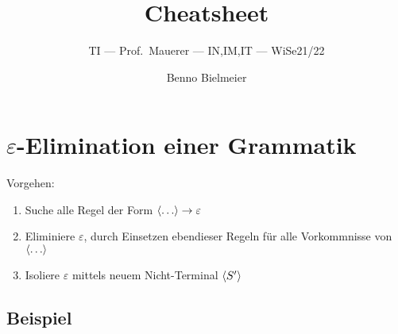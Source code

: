 \documentclass[a4paper,parskip=half,footsepline=on,headings=normal,titlepage=false]{scrartcl}
\title{Cheatsheet}
\subtitle{\acl{TI} --- Prof.~Mauerer --- IN,IM,IT --- \acs{WiSe}21/22}
\author{Benno Bielmeier}
\newcommand{\nt}[1]{\langle \uppercase{#1} \rangle}
\renewcommand{\epsilon}{\varepsilon}
\begin{document}

\begin{acronym}
\end{acronym}

\maketitle
\tableofcontents

\section{\texorpdfstring{$\epsilon$}{Epsilon}-Elimination einer Grammatik}
Vorgehen:
\begin{enumerate}[label=\alph*)]
    \item Suche alle Regel der Form {\color{c1}$\nt{\dots} \to \epsilon$}
    \item {\color{c2}Eliminiere $\epsilon$}, durch Einsetzen ebendieser Regeln für alle Vorkommnisse von \textcolor{c1}{$\nt{\dots}$}
    \item {\color{c3}Isoliere $\epsilon$} mittels neuem Nicht-Terminal \textcolor{c3}{$\nt{S'}$}
\end{enumerate}

\subsection*{Beispiel}
\end{document}
